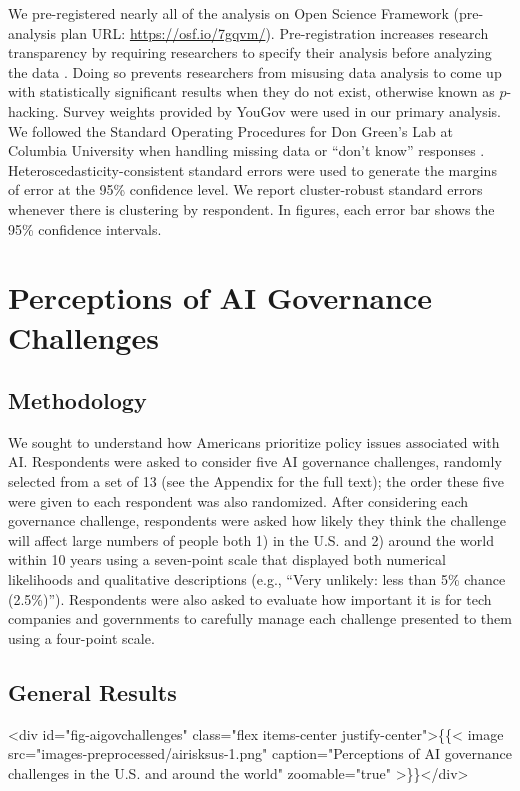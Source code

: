 \documentclass{article}
\begin{document}
We pre-registered nearly all of the analysis on Open Science Framework (pre-analysis plan URL: \url{https://osf.io/7gqvm/}). Pre-registration increases research transparency by requiring researchers to specify their analysis before analyzing the data \citep{nosek2018preregistration}. Doing so prevents researchers from misusing data analysis to come up with statistically significant results when they do not exist, otherwise known as $p$-hacking. Survey weights provided by YouGov were used in our primary analysis. We followed the Standard Operating Procedures for Don Green's Lab at Columbia University when handling missing data or ``don't know'' responses \citep{lin2016standard}. Heteroscedasticity-consistent standard errors were used to generate the margins of error at the 95\% confidence level. We report cluster-robust standard errors whenever there is clustering by respondent. In figures, each error bar shows the 95\% confidence intervals. 

\section{Perceptions of AI Governance Challenges}

\subsection{Methodology}

We sought to understand how Americans prioritize policy issues associated with AI. Respondents were asked to consider five AI governance challenges, randomly selected from a set of 13 (see the Appendix for the full text); the order these five were given to each respondent was also randomized. After considering each governance challenge, respondents were asked how likely they think the challenge will affect large numbers of people both 1) in the U.S. and 2) around the world within 10 years using a seven-point scale that displayed both numerical likelihoods and qualitative descriptions (e.g., ``Very unlikely: less than 5\% chance (2.5\%)''). Respondents were also asked to evaluate how important it is for tech companies and governments to carefully manage each challenge presented to them using a four-point scale.

\subsection{General Results}

<div id="fig-aigovchallenges" class="flex items-center justify-center">\{\{< image src="images-preprocessed/airisksus-1.png" caption="Perceptions of AI governance challenges in the U.S. and around the world" zoomable="true" >\}\}</div>
\end{document}
